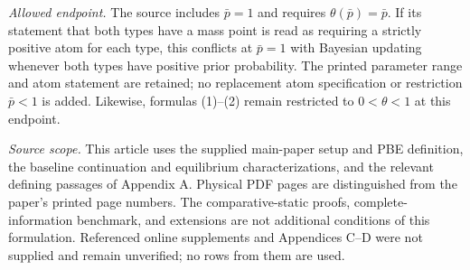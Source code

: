 \documentclass{article}
\begin{document}
\emph{Allowed endpoint.} The source includes $\bar p=1$ and requires $\theta(\bar p)=\bar p$. If its statement that both types have a mass point is read as requiring a strictly positive atom for each type, this conflicts at $\bar p=1$ with Bayesian updating whenever both types have positive prior probability. The printed parameter range and atom statement are retained; no replacement atom specification or restriction $\bar p<1$ is added. Likewise, formulas (1)--(2) remain restricted to $0<\theta<1$ at this endpoint.

\medskip
\noindent\emph{Source scope.} This article uses the supplied main-paper setup and PBE definition, the baseline continuation and equilibrium characterizations, and the relevant defining passages of Appendix A. Physical PDF pages are distinguished from the paper's printed page numbers. The comparative-static proofs, complete-information benchmark, and extensions are not additional conditions of this formulation. Referenced online supplements and Appendices C--D were not supplied and remain unverified; no rows from them are used.
\end{document}
